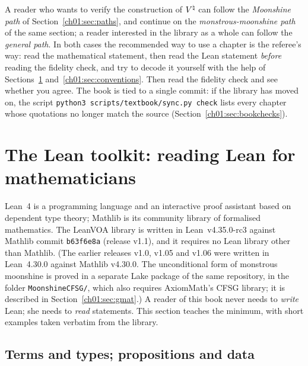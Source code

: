 A reader who wants to verify the construction of ${V^{\natural}}$ can follow the \emph{Moonshine path} of
Section~\ref{ch01:sec:paths}, and continue on the \emph{monstrous-moonshine path} of the same section; a reader interested in the library as a whole can follow the
\emph{general path}. In both cases the recommended way to use a chapter is the referee's way: read
the mathematical statement, then read the Lean statement \emph{before} reading the fidelity check,
and try to decode it yourself with the help of Sections~\ref{ch01:sec:lean}
and~\ref{ch01:sec:conventions}. Then read the fidelity check and see whether you agree. The book is
tied to a single commit: if the library has moved on, the script
\texttt{python3 scripts/textbook/sync.py check} lists every chapter whose quotations no longer match
the source (Section~\ref{ch01:sec:bookchecks}).

\section{The Lean toolkit: reading Lean for mathematicians}\label{ch01:sec:lean}

Lean~4 is a programming language and an interactive proof assistant based on dependent type
theory; Mathlib is its community library of formalised mathematics. The LeanVOA library is written
in Lean~v4.35.0-rc3 against Mathlib commit \texttt{b63f6e8a} (release v1.1), and it requires no Lean library other
than Mathlib. (The earlier releases v1.0, v1.05 and v1.06 were written in Lean~4.30.0 against Mathlib v4.30.0. The
unconditional form of monstrous moonshine is proved in a separate Lake package of the same repository, in the folder
\texttt{MoonshineCFSG/}, which also requires AxiomMath's CFSG library; it is described in
Section~\ref{ch01:sec:gmat}.) A reader of this book never needs to \emph{write} Lean; she
needs to \emph{read} statements. This section teaches the minimum, with short examples taken
verbatim from the library.

\subsection{Terms and types; propositions and data}

